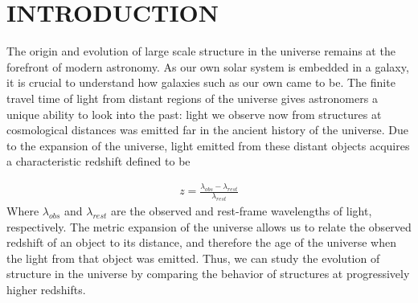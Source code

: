 \documentclass[preprint]{aastex63}
\begin{document}
\section{INTRODUCTION}
The origin and evolution of large scale structure in the universe 
remains at the forefront of modern astronomy. As our own solar system is embedded in a galaxy, it is crucial
to understand how galaxies such as our own came to be. The finite travel time of light from distant regions of the universe 
gives astronomers a unique ability to look into the past: light we observe now from structures at cosmological distances
was emitted far in the ancient history of the universe. Due to the expansion of the universe, light emitted from these 
distant objects acquires a characteristic redshift defined to be

\begin{align}
    \label{eq:redshift}
    z = \frac{\lambda_{obs}-\lambda_{rest}}{\lambda_{rest}}
\end{align}
Where $\lambda_{obs}$ and $\lambda_{rest}$ are the observed and rest-frame wavelengths of light, respectively. The metric expansion of the universe
allows us to relate the observed redshift of an object to its distance, and therefore the age of the universe
when the light from that object was emitted. Thus, we can study the evolution of structure in the universe
by comparing the behavior of structures at progressively higher redshifts.
\end{document}
